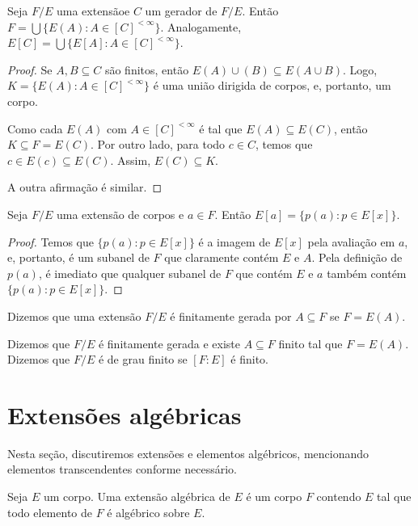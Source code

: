 \begin{lemma}
    Seja $F/E$ uma extensãoe $C$ um gerador de $F/E$. Então $F=\bigcup\{E(A): A \in [C]^{<\infty}\}$. Analogamente, $E[C]=\bigcup\{E[A]: A \in [C]^{<\infty}\}$.
\end{lemma}

\begin{proof}
    Se $A, B\subseteq C$ são finitos, então $E(A)\cup (B)\subseteq E(A\cup B)$. Logo, $K=\{E(A): A \in [C]^{<\infty}\}$ é uma união dirigida de corpos, e, portanto, um corpo.

    Como cada $E(A)$ com $A\in [C]^{<\infty}$ é tal que $E(A)\subseteq E(C)$, então $K\subseteq F=E(C)$.
    Por outro lado, para todo $c \in C$, temos que $c \in E(c)\subseteq E(C)$.
    Assim, $E(C)\subseteq K$.

    A outra afirmação é similar.
\end{proof}

\begin{lemma}
    Seja $F/E$ uma extensão de corpos e $a \in F$. Então $E[a]=\{p(a): p \in E[x]\}$.
\end{lemma}

\begin{proof}
    Temos que $\{p(a): p \in E[x]\}$ é a imagem de $E[x]$ pela avaliação em $a$, e, portanto, é um subanel de $F$ que claramente contém $E$ e $A$. Pela definição de $p(a)$, é imediato que qualquer subanel de $F$ que contém $E$ e $a$ também contém $\{p(a): p \in E[x]\}$.
\end{proof}
\begin{definition}
Dizemos que uma extensão $F/E$ é finitamente gerada por $A\subseteq F$ se $F=E(A)$.

Dizemos que $F/E$ é finitamente gerada e existe $A\subseteq F$ finito tal que $F=E(A)$.
Dizemos que $F/E$ é de grau finito se $[F:E]$ é finito.
\end{definition}
\section{Extensões algébricas}
Nesta seção, discutiremos extensões e elementos algébricos, mencionando elementos transcendentes conforme necessário.
\begin{definition}
Seja $E$ um corpo.
Uma extensão algébrica de $E$ é um corpo $F$ contendo $E$ tal que todo elemento de $F$ é algébrico sobre $E$.
\end{definition}

